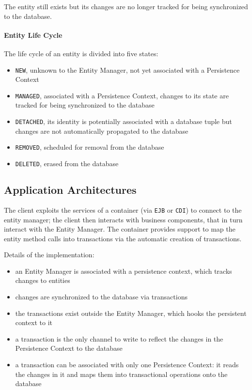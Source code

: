 \documentclass[english]{article}
\begin{document}
The entity still exists but its changes are no longer tracked for being synchronized to the database.

\paragraph{Entity Life Cycle}

The life cycle of an entity is divided into five states:

\begin{itemize}[label=\textbf{\texttt{>}}]
  \item \texttt{NEW}, unknown to the Entity Manager, not yet associated with a Persistence Context
  \item \texttt{MANAGED}, associated with a Persistence Context, changes to its state are tracked for being synchronized to the database
  \item \texttt{DETACHED}, its identity is potentially associated with a database tuple but changes are not automatically propagated to the database
  \item \texttt{REMOVED}, scheduled for removal from the database
  \item \texttt{DELETED}, erased from the database
\end{itemize}

\subsection{\jpa Application Architectures}

The client exploits the services of a container (via \texttt{EJB} or \texttt{CDI}) to connect to the entity manager;
the client then interacts with business components, that in turn interact with the Entity Manager.
The container provides support to map the \jpa entity method calls into transactions via the automatic creation of transactions.

Details of the implementation:

\begin{itemize}
  \item an Entity Manager is associated with a persistence context, which tracks changes to entities
  \item changes are synchronized to the database via transactions
  \item the transactions exist outside the Entity Manager, which hooks the persistent context to it
  \item a transaction is the only channel to write to reflect the changes in the Persistence Context to the database
  \item a transaction can be associated with only one Persistence Context: it reads the changes in it and maps them into transactional operations onto the database
\end{itemize}
\end{document}

